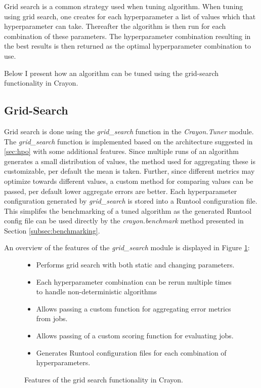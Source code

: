 Grid search is a common strategy used when tuning algorithm. When tuning using grid search, one creates for each hyperparameter a list of values which that hyperparameter can take. Thereafter the algorithm is then run for each combination of these parameters. The hyperparameter combination resulting in the best results is then returned as the optimal hyperparameter combination to use.

Below I present how an algorithm can be tuned using the grid-search functionality in Crayon.

\subsection{Grid-Search}
Grid search is done using the \textit{grid\_search} function in the \textit{Crayon.Tuner} module. The \textit{grid\_search} function is implemented based on the architecture suggested in \ref{sec:hpo} with some additional features. Since multiple runs of an algorithm generates a small distribution of values, the method used for aggregating these is customizable, per default the mean is taken. Further, since different metrics may optimize towards different values, a custom method for comparing values can be passed, per default lower aggregate errors are better. Each hyperparameter configuration generated by \textit{grid\_search} is stored into a Runtool configuration file. This simplifes the benchmarking of a tuned algorithm as the generated Runtool config file can be used directly by the \textit{crayon.benchmark} method presented in Section \ref{subsec:benchmarking}.

An overview of the features of the \textit{grid\_search} module is displayed in Figure \ref{features_grid_search}:

\begin{figure}[h]
  \begin{itemize}
    \item Performs grid search with both static and changing parameters.
    \item Each hyperparameter combination can be rerun multiple times to handle non-deterministic algorithms
    \item Allows passing a custom function for aggregating error metrics from jobs.
    \item Allows passing of a custom scoring function for evaluating jobs.
    \item Generates Runtool configuration files for each combination of hyperparameters.
  \end{itemize}
  \caption{Features of the grid search functionality in Crayon.}
  \label{features_grid_search}
\end{figure}


